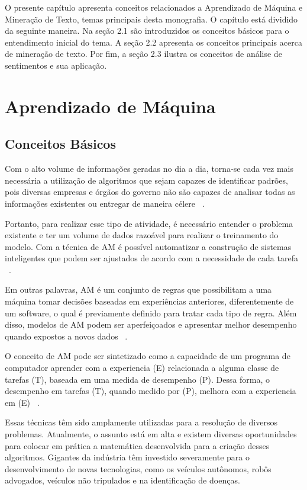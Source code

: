 O presente capítulo apresenta conceitos relacionados a Aprendizado de Máquina e Mineração de Texto, temas principais desta monografia. O capítulo
está dividido da seguinte maneira. Na seção 2.1 são introduzidos os conceitos básicos para o entendimento inicial do tema. A seção 2.2 apresenta os 
conceitos principais acerca de mineração de texto. Por fim, a seção 2.3 ilustra os conceitos de análise de sentimentos e sua aplicação.



\section{Aprendizado de Máquina}
  \subsection{Conceitos Básicos}

    Com o alto volume de informações geradas no dia a dia, torna-se cada vez mais necessária a utilização de algoritmos que sejam capazes de identificar padrões, pois  diversas empresas e órgãos do governo não são capazes de analisar todas as informações existentes ou entregar
    de maneira célere ~\cite{nasrabadi2007pattern}. 
    
  Portanto, para realizar esse tipo de atividade, é necessário entender o problema existente e ter um volume de dados razoável para realizar o treinamento do modelo. Com
a técnica de AM é possível automatizar a construção de sistemas inteligentes que podem
ser ajustados de acordo com a necessidade de cada tarefa ~\cite{bonaccorso2017machine}.


Em outras palavras, \acrshort{AM} é um conjunto de regras que possibilitam a uma máquina tomar decisões baseadas em experiências anteriores, diferentemente de um software, 
o qual é previamente definido para tratar cada tipo de regra. Além disso, modelos de AM podem ser aperfeiçoados e apresentar melhor desempenho quando expostos a novos dados ~\cite{zurada1995review}.

    O conceito de \acrshort{AM} pode ser sintetizado como a capacidade de um programa de computador aprender com a experiencia (E) relacionada a alguma 
    classe de tarefas (T), baseada em uma medida de desempenho (P). Dessa forma, o desempenho em tarefas (T), quando medido por (P), melhora com a 
    experiencia em (E) ~\cite{mitchell}.

Essas técnicas têm sido amplamente utilizadas para a resolução de diversos problemas. Atualmente, o assunto está em alta e existem diversas oportunidades para colocar em prática a matemática desenvolvida para a criação desses algoritmos. Gigantes da indústria têm investido severamente para o desenvolvimento de novas tecnologias, como os veículos autônomos, robôs advogados, veículos não tripulados e na identificação de doenças.

